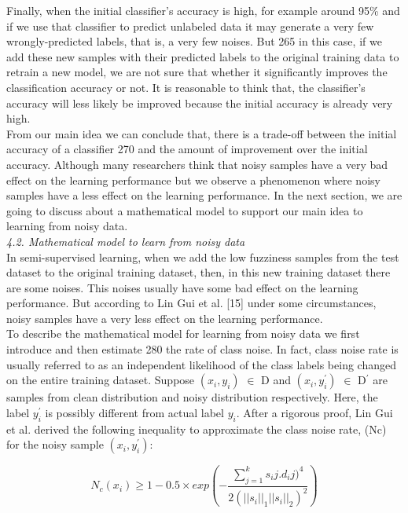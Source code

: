 \documentclass{article}
\begin{document}
		
		
		\newpage 
		
		Finally, when the initial classifier’s accuracy is high, for example around 95\% and if we use that classifier
		to predict unlabeled data it may generate a very few wrongly-predicted labels, that is, a very few noises. But
		265 in this case, if we add these new samples with their predicted labels to the original training data to retrain
		a new model, we are not sure that whether it significantly improves the classification accuracy or not. It is
		reasonable to think that, the classifier’s accuracy will less likely be improved because the initial accuracy is
		already very high.\\
		
		From our main idea we can conclude that, there is a trade-off between the initial accuracy of a classifier
		270 and the amount of improvement over the initial accuracy. Although many researchers think that noisy
		samples have a very bad effect on the learning performance but we observe a phenomenon where noisy
		samples have a less effect on the learning performance. In the next section, we are going to discuss about a
		mathematical model to support our main idea to learning from noisy data.\\
		
		\textit{4.2. Mathematical model to learn from noisy data}\\

		In semi-supervised learning, when we add the low fuzziness samples from the test dataset to the original
		training dataset, then, in this new training dataset there are some noises. This noises usually have some bad
		effect on the learning performance. But according to Lin Gui et al. [15] under some circumstances, noisy
		samples have a very less effect on the learning performance.\\
		
		To describe the mathematical model for learning from noisy data we first introduce and then estimate
		280 the rate of class noise. In fact, class noise rate is usually referred to as an independent likelihood of the class labels being changed on the entire training dataset. Suppose $(x_i, y_i)$ $\in$ D and $(x_i, y_i ^{\prime})$ $\in$ D$^{\prime} $ are samples from clean distribution and noisy distribution respectively. Here, the label $y_i^{\prime}$ is possibly different from actual label $y_i$. After a rigorous proof, Lin Gui et al. derived the following inequality to approximate the class noise rate, (Nc) for the noisy sample $(x_i, y_i^{\prime})$:
		\begin{center}
			\begin{equation} \label{$eq:(1)$}
				N_c(x_i) \ge 1 - 0.5 \times exp(-\frac {\sum_{j=1}^{k} s_ij . d_ij )^4}{2(||s_i||_1||s_i||_2)^2})
			\end{equation}
		\end{center}
		
\end{document}
